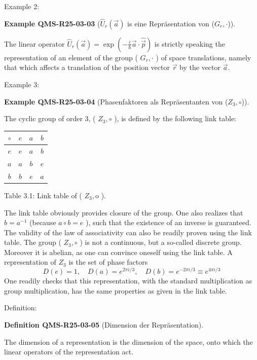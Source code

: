 \documentclass[10pt, letterpaper]{article}
\newcommand{\CustomHeading}[3]{%
  \par\medskip\noindent%
  \textbf{#1 #2} \textnormal{(#3)}.\enskip%
}
\newenvironment{DEF}[2]{\begin{unitbox}\CustomHeading{Definition}{#1}{#2}}{\end{unitbox}}
\newenvironment{EXA}[2]{\begin{unitbox}\CustomHeading{Example}{#1}{#2}}{\end{unitbox}}
\begin{document}
Example 2: 

\begin{EXA}{QMS-R25-03-03}{$\hat{U}_{r}(\vec{a})$ is eine Repräsentation von ($G_{r}, \cdot$)}
The linear operator $\hat{U}_{r}(\vec{a})=\exp \left(-\frac{i}{\hbar} \vec{a} \cdot \hat{\vec{p}}\right)$ is strictly speaking the representation of an element of the group ( $G_{r}, \cdot$ ) of space translations, namely that which affects a translation of the position vector $\vec{r}$ by the vector $\vec{a}$.
\end{EXA}


Example 3: 

\begin{EXA}{QMS-R25-03-04}{Phasenfaktoren als Repräsentanten von ($Z_{3}, \circ$)}
The cyclic group of order 3, ( $Z_{3}, \circ$ ), is defined by the following link table:
\begin{center}
\begin{tabular}{c||c|c|c|}
$\circ$ & $e$ & $a$ & $b$ \\
\hline\hline
$e$ & $e$ & $a$ & $b$ \\
\hline
$a$ & $a$ & $b$ & $e$ \\
\hline
$b$ & $b$ & $e$ & $a$ \\
\hline
\end{tabular}
\end{center}
Table 3.1: Link table of ( $Z_{3}, \mathrm{o}$ ).

The link table obviously provides closure of the group. One also realizes that $b=a^{-1}$ (because $a \circ b=e$ ), such that the existence of an inverse is guaranteed. The validity of the law of associativity can also be readily proven using the link table. The group ( $Z_{3}, \circ$ ) is not a continuous, but a so-called discrete group. Moreover it is abelian, as one can convince oneself using the link table. A representation of $Z_{3}$ is the set of phase factors
$$
D(e)=1, \quad D(a)=e^{2 \pi i / 3}, \quad D(b)=e^{-2 \pi i / 3} \equiv e^{4 \pi i / 3}
$$
One readily checks that this representation, with the standard multiplication as group multiplication, has the same properties as given in the link table.
\end{EXA}


Definition: 

\begin{DEF}{QMS-R25-03-05}{Dimension der Repräsentation}
The dimension of a representation is the dimension of the space, onto which the linear operators of the representation act.
\end{DEF}
\end{document}
